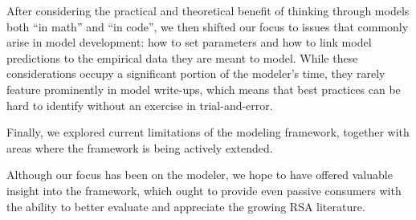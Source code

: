 \documentclass[10pt,letterpaper]{article}
\begin{document}
After considering the practical and theoretical benefit of thinking through models both ``in math'' and ``in code'', 
we then shifted our focus to issues that commonly arise in model development: how to set parameters and how to link model predictions to the empirical data they are meant to model. While these considerations occupy a significant portion of the modeler's time, they rarely feature prominently in model write-ups, which means that best practices can be hard to identify without an exercise in trial-and-error.

Finally, we explored current limitations of the modeling framework, together with areas where the framework is being actively extended.

Although our focus has been on the modeler, we hope to have offered valuable insight into the framework, which ought to provide even passive consumers with the ability to better evaluate and appreciate the growing RSA literature.



\nolinenumbers


\end{document}

